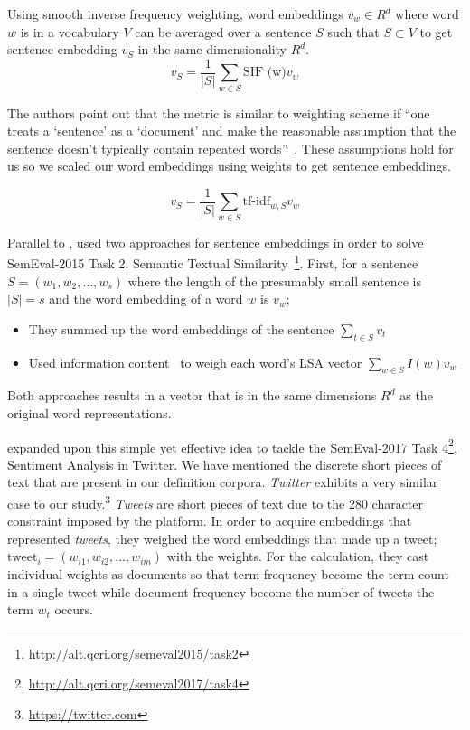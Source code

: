 Using smooth inverse frequency weighting, word embeddings $v_w \in R^{d}$ where word $w$ is in a vocabulary $V$ can be averaged over a sentence $S$ such that $S \subset V$ to get sentence embedding $v_S$ in the same dimensionality $R^{d}$.
\begin{equation}
    v_S = \frac{1}{|S|}\sum_{w \in S}\text{SIF (w)}v_{w}
\end{equation}

The authors point out that the metric is similar to \tfidf{} weighting scheme if \enquote{one treats a \enquote{sentence} as a \enquote{document} and make the reasonable assumption that the sentence doesn't typically contain repeated words}~\cite{arora_simple_2016}.
These assumptions hold for us so we scaled our word embeddings using \tfidf{} weights to get sentence embeddings.

\begin{equation}
    v_S = \frac{1}{|S|}\sum_{w \in S}\text{tf-idf}_{w,S} v_w
\end{equation}

Parallel to \citeauthor{arora_simple_2016}, \textcite{zhao_ecnu_2015} used two approaches for sentence embeddings in order to solve SemEval-2015 Task 2: Semantic Textual Similarity~\footnote{\url{http://alt.qcri.org/semeval2015/task2}}.
First, for a sentence $S = (w_{1}, w_{2}, \dots, w_{s})$ where the length of the presumably small sentence is $|S| = s$ and the word embedding of a word $w$ is $v_w$;
\begin{itemize}
    \item They summed up the word embeddings of the sentence $\sum_{t \in S}v_{t}$
    \item Used information content~\cite{saric_takelab_2012} to weigh each word's LSA vector $\sum_{w \in S} I(w) v_{w}$
\end{itemize}
Both approaches results in a vector that is in the same dimensions $R^{d}$ as the original word representations.

\textcite{edilson_a._correa_nilc-usp_2017} expanded upon this simple yet effective idea to tackle the SemEval-2017 Task 4\footnote{\url{http://alt.qcri.org/semeval2017/task4}}, Sentiment Analysis in Twitter.
We have mentioned the discrete short pieces of text that are present in our definition corpora.
\emph{Twitter} exhibits a very similar case to our study.\footnote{\url{https://twitter.com}}
\emph{Tweets} are short pieces of text due to the 280 character constraint imposed by the platform.
In order to acquire embeddings that represented \emph{tweets}, they weighed the word embeddings that made up a tweet; $\text{tweet}_i = (w_{i1}, w_{i2}, \dots, w_{im})$ with the \tfidf{} weights.
For the \tfidf{} calculation, they cast individual weights as documents so that term frequency become the term count in a single tweet while document frequency become the number of tweets the term $w_t$ occurs.

